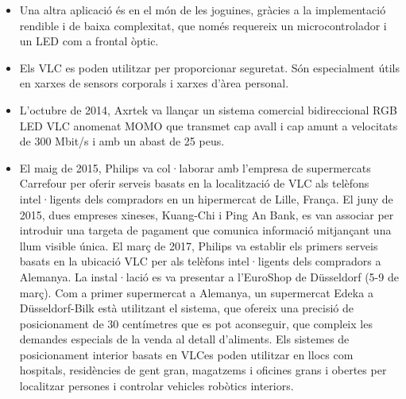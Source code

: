 \begin{itemize}
    \item Una altra aplicació és en el món de les joguines, gràcies a la implementació rendible i de baixa complexitat, que només requereix un microcontrolador i un LED com a frontal òptic.
    \item Els VLC es poden utilitzar per proporcionar seguretat. Són especialment útils en xarxes de sensors corporals i xarxes d'àrea personal.
    \item L'octubre de 2014, Axrtek va llançar un sistema comercial bidireccional RGB LED VLC anomenat MOMO que transmet cap avall i cap amunt a velocitats de 300 Mbit/s i amb un abast de 25 peus.
    \item El maig de 2015, Philips va col·laborar amb l'empresa de supermercats Carrefour per oferir serveis basats en la localització de VLC als telèfons intel·ligents dels compradors en un hipermercat de Lille, França. El juny de 2015, dues empreses xineses, Kuang-Chi i Ping An Bank, es van associar per introduir una targeta de pagament que comunica informació mitjançant una llum visible única. El març de 2017, Philips va establir els primers serveis basats en la ubicació VLC per als telèfons intel·ligents dels compradors a Alemanya. La instal·lació es va presentar a l'EuroShop de Düsseldorf (5-9 de març). Com a primer supermercat a Alemanya, un supermercat Edeka a Düsseldorf-Bilk està utilitzant el sistema, que ofereix una precisió de posicionament de 30 centímetres que es pot aconseguir, que compleix les demandes especials de la venda al detall d'aliments. Els sistemes de posicionament interior basats en VLCes poden utilitzar en llocs com hospitals, residències de gent gran, magatzems i oficines grans i obertes per localitzar persones i controlar vehicles robòtics interiors.
\end{itemize}